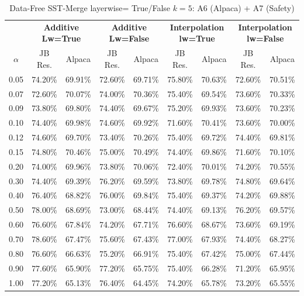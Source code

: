 \begin{table}[h]
\centering
\caption{Data-Free SST-Merge layerwise= True/False $k=5$: A6 (Alpaca) + A7 (Safety)}
\label{tab:res_a6_data_free_sst_5}
\begin{tabular}{c|cc|cc|cc|cc}
\hline
 & \multicolumn{2}{c|}{\textbf{Additive Lw=True}} & \multicolumn{2}{c|}{\textbf{Additive Lw=False}} & \multicolumn{2}{c|}{\textbf{Interpolation lw=True}}& \multicolumn{2}{c}{\textbf{Interpolation lw=False}} \\
$\alpha$ & JB Res. & Alpaca & JB Res. & Alpaca & JB Res. & Alpaca & JB Res. & Alpaca \\
\hline
0.05 & 74.20\% & 69.91\% & 72.60\% & 69.71\% & 75.80\% & 70.63\% & 72.60\% & 70.51\% \\
0.07 & 72.60\% & 70.07\% & 74.00\% & 70.36\% & 75.40\% & 69.54\% & 73.60\% & 70.33\% \\
0.09 & 73.80\% & 69.80\% & 74.40\% & 69.67\% & 75.20\% & 69.93\% & 73.60\% & 70.23\% \\
0.10 & 74.40\% & 69.98\% & 74.60\% & 69.92\% & 71.60\% & 70.41\% & 73.60\% & 70.00\% \\
0.12 & 74.60\% & 69.70\% & 73.40\% & 70.26\% & 75.40\% & 69.72\% & 74.40\% & 69.81\% \\
0.15 & 74.80\% & 70.46\% & 75.00\% & 70.49\% & 74.40\% & 69.86\% & 71.60\% & 70.10\% \\
0.20 & 74.00\% & 69.96\% & 73.80\% & 70.06\% & 72.40\% & 70.01\% & 74.20\% & 70.55\% \\
0.30 & 74.40\% & 69.39\% & 76.20\% & 69.59\% & 73.80\% & 69.78\% & 74.80\% & 69.64\% \\
0.40 & 76.40\% & 68.82\% & 76.00\% & 69.84\% & 75.40\% & 69.37\% & 74.20\% & 69.88\% \\
0.50 & 78.00\% & 68.69\% & 73.00\% & 68.44\% & 74.40\% & 69.13\% & 76.20\% & 69.57\% \\
0.60 & 76.60\% & 67.84\% & 74.20\% & 67.71\% & 76.60\% & 68.67\% & 73.60\% & 69.19\% \\
0.70 & 78.60\% & 67.47\% & 75.60\% & 67.43\% & 77.00\% & 67.93\% & 74.40\% & 68.27\% \\
0.80 & 76.60\% & 66.63\% & 75.20\% & 66.91\% & 75.40\% & 67.42\% & 75.00\% & 67.44\% \\
0.90 & 77.60\% & 65.90\% & 77.20\% & 65.75\% & 75.40\% & 66.28\% & 71.20\% & 65.95\% \\
1.00 & 77.20\% & 65.13\% & 76.40\% & 64.45\% & 74.20\% & 65.78\% & 73.20\% & 65.55\% \\
\hline
\end{tabular}
\end{table}
\FloatBarrier

